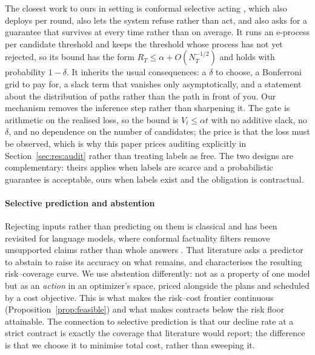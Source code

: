 The closest work to ours in setting is conformal selective acting
\citep{csa2026}, which also deploys per round, also lets the system
refuse rather than act, and also asks for a guarantee that survives at
every time rather than on average. It runs an e-process per candidate
threshold and keeps the threshold whose process has not yet rejected, so
its bound has the form $R_T \le \alpha + O(N_T^{-1/2})$ and holds with
probability $1-\delta$. It inherits the usual consequences: a $\delta$
to choose, a Bonferroni grid to pay for, a slack term that vanishes only
asymptotically, and a statement about the distribution of paths rather
than the path in front of you. Our mechanism removes the inference step
rather than sharpening it. The gate is arithmetic on the realised loss,
so the bound is $V_t \le \alpha t$ with no additive slack, no $\delta$,
and no dependence on the number of candidates; the price is that the
loss must be observed, which is why this paper prices auditing
explicitly in Section~\ref{sec:res:audit} rather than treating labels
as free. The
two designs are complementary: theirs applies when labels are scarce and
a probabilistic guarantee is acceptable, ours when labels exist and the
obligation is contractual.

\paragraph{Selective prediction and abstention}
Rejecting inputs rather than predicting on them is classical
\citep{chow1970optimum,geifman2017selective,elyaniv2010foundations} and
has been revisited for language models, where conformal factuality
filters remove unsupported claims rather than whole answers
\citep{mohri2024factuality}. That literature asks a predictor to abstain to
raise its accuracy on what remains, and characterises the resulting
risk--coverage curve. We use abstention differently: not as a property of
one model but as an \emph{action} in an optimizer's space, priced
alongside the plans and scheduled by a cost objective. This is what makes
the risk--cost frontier continuous (Proposition~\ref{prop:feasible}) and
what makes contracts below the risk floor attainable. The connection to
selective prediction is that our decline rate at a strict contract is
exactly the coverage that literature would report; the difference is that
we choose it to minimise total cost, rather than sweeping it.

